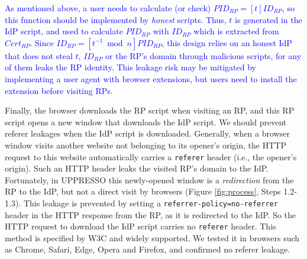 
\textcolor{blue}{As mentioned above,
    a user needs to calculate (or check) $PID_{RP} = [t]ID_{RP}$,
    so this function should be implemented by \emph{honest} scripts.
Thus, $t$ is generated in the IdP script,
    and used to calculate $PID_{RP}$ with $ID_{RP}$ which is extracted from $Cert_{RP}$.
Since $ID_{RP} = [t^{-1}\bmod n]PID_{RP}$,
    this design relies on an honest IdP that does not steal $t$, $ID_{RP}$ or the RP's domain through malicious scripts,
        for any of them leaks the RP identity.
This leakage risk may be mitigated
    by implementing a user agent with browser extensions,
but users need to install the extension before visiting RPs.}

Finally,
    the browser downloads the RP script when visiting an RP,
     and this RP script opens a new window that downloads the IdP script.
We should prevent referer leakages when the IdP script is downloaded.
Generally, when a browser window visits another website not belonging to its opener's origin,
 the HTTP request to this website automatically carries a \verb+referer+ header (i.e., the opener's origin).
Such an HTTP header leaks the visited RP's domain to the IdP.
Fortunately, in UPPRESSO this newly-opened window is a \emph{redirection} from the RP to the IdP,
 but not a direct visit by browsers (Figure \ref{fig:process}, Steps 1.2-1.3).
This leakage is prevented by setting a \verb+referrer-policy=no-referrer+ header in the HTTP response from the RP,
 as it is redirected to the IdP.
So the HTTP request to download the IdP script carries no \verb+referer+ header.
This method is specified by W3C \cite{referer_policy} and widely supported.
We tested it in browsers such as Chrome, Safari, Edge, Opera and Firefox, and confirmed no referer leakage.




